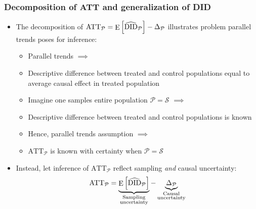\documentclass[table, xcolor = {dvipsnames}, 9pt]{beamer}
\theoremstyle{plain}
\DeclareMathOperator{\E}{\rm{E}}
\begin{document}
\begin{frame}[t]
\frametitle{Decomposition of ATT and generalization of DID}
\vfill
\begin{itemize}
\item The decomposition of $\text{ATT}_{\mathcal{P}} = \E\left[\widehat{\text{DID}}_{\mathcal{P}}\right] - \Delta_{\mathcal{P}}$ illustrates problem parallel trends poses for inference: \vfill
\begin{itemize}
\item \pause Parallel trends $\implies$ \vfill
\item[] \pause Descriptive difference between treated and control populations equal to average causal effect in treated population \vfill
\item \pause Imagine one samples entire population $\mathcal{P} = \mathcal{S}$ $\implies$ \vfill
\item[] \pause Descriptive difference between treated and control populations is known \vfill
\item \pause Hence, parallel trends assumption $\implies$ \vfill 
\item[] \pause $\text{ATT}_{\mathcal{P}}$ is known with certainty when $\mathcal{P} = \mathcal{S}$ \vfill
\end{itemize}
\item \pause Instead, let inference of $\text{ATT}_{\mathcal{P}}$ reflect sampling \textit{and} causal uncertainty: \pause \vfill
\begin{align*}
\text{ATT}_{\mathcal{P}} = \underbrace{\E\left[\widehat{\text{DID}}_{\mathcal{P}}\right]}_{\substack{\text{Sampling} \\ \text{uncertainty}}} - \underbrace{\Delta_{\mathcal{P}}}_{\substack{\text{Causal} \\ \text{uncertainty}}}
\end{align*} \vfill
\end{itemize}
\vfill
\end{frame}
\end{document}

